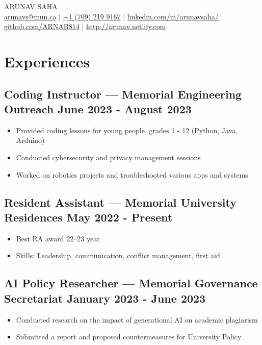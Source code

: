 \documentclass[10pt]{article}
\begin{document}
\begin{center}
    {\fontsize{32}{32}\selectfont\interthin ARUNAV SAHA} \\ \bigskip
    {\color{icnclr}\faEnvelope[regular]} \href{mailto:arunavs@mun.ca}{arunavs@mun.ca} $|$ 
    {\color{icnclr}} \href{tel:+17092199167}{+1 (709) 219 9167} $|$
    {\color{icnclr}\faLinkedinIn} \href{https://www.linkedin.com/in/arunavsaha/}{linkedin.com/in/arunavsaha/} $|$
    {\color{icnclr}\faGithub} \href{https://github.com/ARNAB814}{github.com/ARNAB814} $|$
    {\color{icnclr}\faGlobe} \href{http://arunav.netlify.com}{http://arunav.netlify.com}
\end{center}

\section{Experiences}

\subsection{Coding Instructor — Memorial Engineering Outreach \hfill June 2023 - August 2023}
\begin{itemize}
    \item Provided coding lessons for young people, grades 1 - 12 (Python, Java, Arduino)
    \item Conducted cybersecurity and privacy management sessions
    \item Worked on robotics projects and troubleshooted various apps and systems
\end{itemize}


\subsection{Resident Assistant — Memorial University Residences \hfill May 2022 - Present}
\begin{itemize}
    \item Best RA award 22–23 year
    \item Skills: Leadership, communication, conflict management, first aid
\end{itemize}


\subsection{AI Policy Researcher — Memorial Governance Secretariat \hfill January 2023 - June 2023}
\begin{itemize}
    \item Conducted research on the impact of generational AI on academic plagiarism
    \item Submitted a report and proposed countermeasures for University Policy
\end{itemize}
\end{document}
